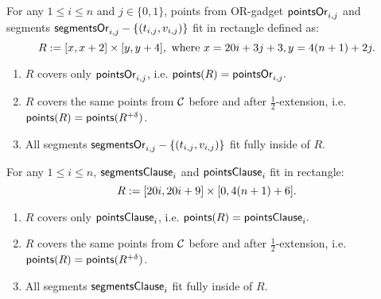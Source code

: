 \begin{claim}
\label{claim:or_bounding_rectangle}
For any $1 \le i \le n$ and $j \in \{0, 1\}$,
points from OR-gadget $\mathsf{pointsOr}_{i,j}$ 
and segments $\mathsf{segmentsOr}_{i,j} - \{(t_{i, j}, v_{i, j})\}$
fit in rectangle defined as:
$$R := [x,x+2] \times [y,y+4],
\text{ where } x = 20 i+3j+3, y = 4(n+1)+2j.$$
\begin{enumerate}[label={(\arabic*)}]
\item $R$ covers only $\mathsf{pointsOr}_{i,j}$, i.e. $\mathsf{points}(R) = \mathsf{pointsOr}_{i,j}.$
\item $R$ covers the same points from $\mathcal{C}$
before and after $\frac{1}{2}$-extension, i.e.
$\mathsf{points}(R) = \mathsf{points}(R^{+\delta})$.
\item All segments $\mathsf{segmentsOr}_{i,j} - \{(t_{i, j}, v_{i, j})\}$
fit fully inside of $R$.
\end{enumerate}
\end{claim}

\begin{claim}
\label{claim:clause_bounding_rectangle}
For any $1 \le i \le n$, $\mathsf{segmentsClause}_i$ and $\mathsf{pointsClause}_{i}$
fit in rectangle:
$$R :=  [20 i,20 i+9] \times [0,4(n+1)+6].$$
\begin{enumerate}[label={(\arabic*)}]
\item $R$ covers only $\mathsf{pointsClause}_{i}$, i.e. $\mathsf{points}(R) = \mathsf{pointsClause}_{i}.$
\item $R$ covers the same points from $\mathcal{C}$
before and after $\frac{1}{2}$-extension, i.e.
$\mathsf{points}(R) = \mathsf{points}(R^{+\delta})$.
\item All segments $\mathsf{segmentsClause}_i$ fit fully inside of $R$.
\end{enumerate}
\end{claim}

